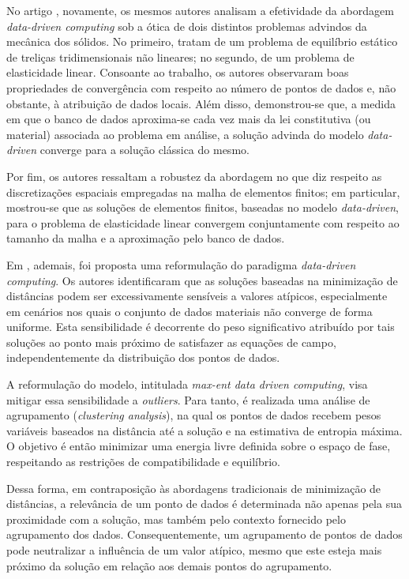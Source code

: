 No artigo \cite{Kirchdoerfer2016}, novamente, os mesmos autores analisam a efetividade da abordagem \textit{data-driven computing} sob a ótica de dois distintos problemas advindos da mecânica dos sólidos. No primeiro, tratam de um problema de equilíbrio estático de treliças tridimensionais não lineares; no segundo, de um problema de elasticidade linear. Consoante ao trabalho, os autores observaram boas propriedades de convergência com respeito ao número de pontos de dados e, não obstante, à atribuição de dados locais. Além disso, demonstrou-se que, a medida em que o banco de dados aproxima-se cada vez mais da lei constitutiva (ou material) associada ao problema em análise, a solução advinda do modelo \textit{data-driven} converge para a solução clássica do mesmo. 

Por fim, os autores ressaltam a robustez da abordagem no que diz respeito as discretizações espaciais empregadas na malha de elementos finitos; em particular, mostrou-se que as soluções de elementos finitos, baseadas no modelo \textit{data-driven}, para o problema de elasticidade linear convergem conjuntamente com respeito ao tamanho da malha e a aproximação pelo banco de dados.  

Em \cite{Kirchdoerfer2017}, ademais, foi proposta uma reformulação do paradigma \textit{data-driven computing}. Os autores identificaram que as soluções baseadas na minimização de distâncias podem ser excessivamente sensíveis a valores atípicos, especialmente em cenários nos quais o conjunto de dados materiais não converge de forma uniforme. Esta sensibilidade é decorrente do peso significativo atribuído por tais soluções ao ponto mais próximo de satisfazer as equações de campo, independentemente da distribuição dos pontos de dados.

A reformulação do modelo, intitulada \textit{max-ent data driven computing}, visa mitigar essa sensibilidade a \textit{outliers}. Para tanto, é realizada uma análise de agrupamento (\textit{clustering analysis}), na qual os pontos de dados recebem pesos variáveis baseados na distância até a solução e na estimativa de entropia máxima. O objetivo é então minimizar uma energia livre definida sobre o espaço de fase, respeitando as restrições de compatibilidade e equilíbrio.

Dessa forma, em contraposição às abordagens tradicionais de minimização de distâncias, a relevância de um ponto de dados é determinada não apenas pela sua proximidade com a solução, mas também pelo contexto fornecido pelo agrupamento dos dados. Consequentemente, um agrupamento de pontos de dados pode neutralizar a influência de um valor atípico, mesmo que este esteja mais próximo da solução em relação aos demais pontos do agrupamento.

